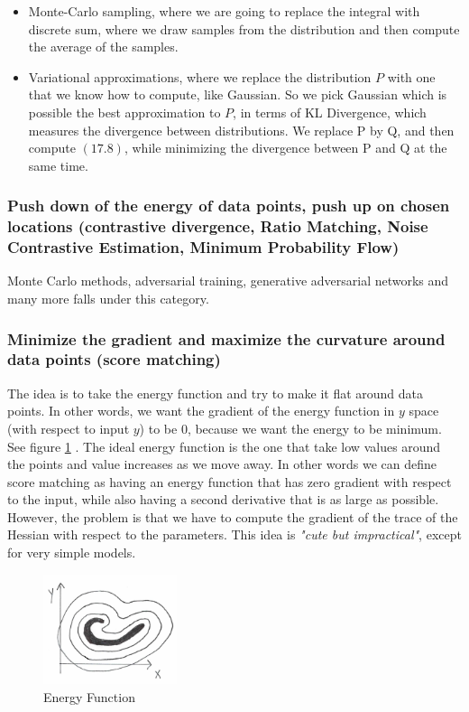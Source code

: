 \begin{itemize}
    \item Monte-Carlo sampling, where we are going to replace the integral with discrete sum, where we draw samples from the distribution and then compute the average of the samples.
    \item Variational approximations, where we replace the distribution $P$ with one that we know how to compute, like Gaussian. 
    So we pick Gaussian which is possible the best approximation to $P$, in terms of KL Divergence, which measures the divergence between distributions. 
    We replace P by Q, and then compute $(17.8)$, while minimizing the divergence between P and Q at the same time.
\end{itemize}

\subsubsection{Push down of the energy of data points, push up on chosen locations (contrastive divergence, Ratio Matching, Noise Contrastive Estimation, Minimum Probability Flow)}

Monte Carlo methods, adversarial training, generative adversarial networks and many more falls under this category.
 
\subsubsection{Minimize the gradient and maximize the curvature around data points (score matching)}

The idea is to take the energy function and try to make it flat around data points.
In other words, we want the gradient of the energy function in $y$ space (with respect to input $y$) to be $0$, because we want the energy to be minimum. 
See figure \ref{figure8} . 
The ideal energy function is the one that take low values around the points and value increases as we move away. 
In other words we can define score matching as having an energy function that has zero gradient with respect to the input, while also having a second derivative that is as large as possible. 
However, the problem is that we have to compute the gradient of the trace of the Hessian with respect to the parameters. 
This idea is \textit{"cute but impractical"}, except for very simple models. 

\begin{figure}[htb]
    \centering
    \includegraphics[width=0.35\textwidth]{figs/pic8.png}
    \caption{Energy Function}
    \label{figure8}
\end{figure}

